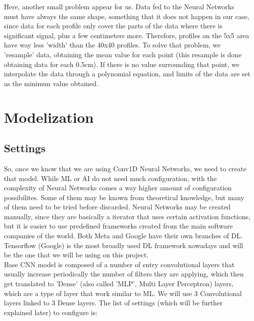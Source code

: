 \documentclass[openany]{article}
\begin{document}
Here, another small problem appear for us. Data fed to the Neural Networks must have always the same shape, something that it does not happen in our case, since data for each profile only cover the parts of the data where there is significant signal, plus a few centimeters more. Therefore, profiles on the 5x5 area have way less 'width' than the 40x40 profiles. To solve that problem, we 'resample' data, obtaining the mean value for each point (this resample is done obtaining data for each 0.5cm). If there is no value surrounding that point, we interpolate the data through a polynomial equation, and limits of the data are set as the minimun value obtained.




\newpage

\section{Modelization}

\subsection{Settings}

So, once we know that we are using Conv1D Neural Networks, we need to create that model. While ML or AI do not need much configuration, with the complexity of Neural Networks comes a way higher amount of configuration possibilites. Some of them may be known from theoretical knowledge, but many of them need to be tried before discarded. Neural Networks may be created manually, since they are basically a iterator that uses certain activation functions, but it is easier to use predefined frameworks created from the main software companies of the world. Both Meta and Google have their own branches of DL. Tensorflow (Google) \cite{45381} is the most broadly used DL framework nowadays and will be the one that we will be using on this project. \\

Base CNN model is composed of a number of entry convolutional layers that usually increase periodically the number of filters they are applying, which then get translated to 'Dense' (also called 'MLP', Multi Layer Perceptron) layers, which are a type of layer that work similar to ML. We will use 3 Convolutional layers linked to 3 Dense layers. The list of settings (which will be further explained later) to configure is:
\end{document}
